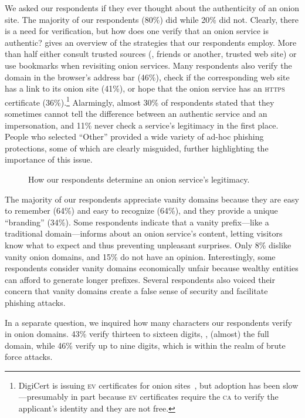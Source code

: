 We asked our respondents if they ever thought about the authenticity of an onion
site.  The majority of our respondents (80\%) did while 20\% did not.  Clearly,
there is a need for verification, but how does one verify that an onion service
is authentic?   gives an overview of the
strategies that our respondents employ.  More than half either consult trusted
sources (\eg, friends or another, trusted web site) or use bookmarks when
revisiting onion services.  Many respondents also verify the domain in the
browser's address bar (46\%), check if the corresponding web site has a link to
its onion site (41\%), or hope that the onion service has an \textsc{https}
certificate (36\%).\footnote{DigiCert is issuing \textsc{ev} certificates for
onion sites~\cite{DigiCert2015a}, but adoption has been slow---presumably in part
because \textsc{ev} certificates require the \textsc{ca} to verify the
applicant's identity and they are not free.}  Alarmingly, almost 30\% of
respondents stated that they sometimes cannot tell the difference between an
authentic service and an impersonation, and 11\% never check a service's
legitimacy in the first place.  People who selected ``Other'' provided a wide
variety of ad-hoc phishing protections, some of which are clearly misguided,
further highlighting the importance of this issue.

\begin{figure}[t]
    \centering
    
    \caption{How our respondents determine an onion service's legitimacy.}
    \label{fig:determining-legitimacy}
\end{figure}

The majority of our respondents appreciate vanity domains because they are easy
to remember (64\%) and easy to recognize (64\%), and they provide a unique
``branding'' (34\%).  Some respondents indicate that a vanity prefix---like a
traditional domain---informs about an onion service's content, letting visitors
know what to expect and thus preventing unpleasant surprises.  Only 8\% dislike
vanity onion domains, and 15\% do not have an opinion.  Interestingly, some
respondents consider vanity domains economically unfair because wealthy entities
can afford to generate longer prefixes.  Several respondents also voiced their
concern that vanity domains create a false sense of security and facilitate
phishing attacks.

In a separate question, we inquired how many characters our respondents verify in
onion domains.  43\% verify thirteen to sixteen digits, \ie, (almost) the full
domain, while 46\% verify up to nine digits, which is within the realm of brute
force attacks.

